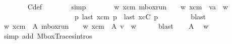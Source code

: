 \begin{isabellebody}
\ \ \ \ \ \ \isamarkupfalse%
\ C{}{\isacharunderscore}{\kern0pt}def\isanewline
\ \ \ \ \ \ \isamarkupfalse%
\ simp\isanewline
\ \ \ \ \isamarkupfalse%
\ \isamarkupfalse%
\ {\isachardoublequoteopen}{\isasymexists}w\ xcm{\isachardot}{\kern0pt}\ mbox{\isacharunderscore}{\kern0pt}run\ {\isasymC}\isactrlsub {\isasymI}\isactrlsub {\isasymmm}\ {\isacharparenleft}{\kern0pt}{\isasymB}\ {}{\isacharparenright}{\kern0pt}\ w\ xcm\ {\isasymand}\ v{\isasymcdot}{\isacharbrackleft}{\kern0pt}a{\isacharbrackright}{\kern0pt}\ {\isacharequal}{\kern0pt}\ w{\isasymdown}\isactrlsub {\isacharbang}{\kern0pt}\ {\isasymand}\isanewline
\ \ \ \ \ \ \ \ \ \ \ \ \ \ \ \ \ \ \ \ \ {\isacharparenleft}{\kern0pt}{\isasymforall}p{\isachardot}{\kern0pt}\ last\ {\isacharparenleft}{\kern0pt}{\isasymC}\isactrlsub {\isasymI}\isactrlsub {\isasymmm}{\isacharhash}{\kern0pt}xcm{\isacharparenright}{\kern0pt}\ p\ {\isacharequal}{\kern0pt}\ {\isacharparenleft}{\kern0pt}last\ {\isacharparenleft}{\kern0pt}{\isasymC}\isactrlsub {\isasymI}\isactrlsub {\isasymzero}{\isacharhash}{\kern0pt}{\isacharparenleft}{\kern0pt}xc{\isasymcdot}{\isacharbrackleft}{\kern0pt}C{\isacharbrackright}{\kern0pt}{\isacharparenright}{\kern0pt}{\isacharparenright}{\kern0pt}\ p{\isacharcomma}{\kern0pt}\ {\isasymepsilon}{\isacharparenright}{\kern0pt}{\isacharparenright}{\kern0pt}{\isachardoublequoteclose}\isanewline
\ \ \ \ \ \ \isamarkupfalse%
\ blast\isanewline
\ \ \isamarkupfalse%
\isanewline
\ \ \isamarkupfalse%
\ \isamarkupfalse%
\ w\ xcm\ \ A{}{\isacharcolon}{\kern0pt}\ {\isachardoublequoteopen}mbox{\isacharunderscore}{\kern0pt}run\ {\isasymC}\isactrlsub {\isasymI}\isactrlsub {\isasymmm}\ {\isacharparenleft}{\kern0pt}{\isasymB}\ {}{\isacharparenright}{\kern0pt}\ w\ xcm{\isachardoublequoteclose}\ \ A{}{\isacharcolon}{\kern0pt}\ {\isachardoublequoteopen}v\ {\isacharequal}{\kern0pt}\ w{\isasymdown}\isactrlsub {\isacharbang}{\kern0pt}{\isachardoublequoteclose}\isanewline
\ \ \ \ \isamarkupfalse%
\ blast\isanewline
\ \ \isamarkupfalse%
\ A{}\ \isamarkupfalse%
\ {\isachardoublequoteopen}w\ {\isasymin}\ {\isasymT}\isactrlbsub {\isasymB}\ {}\isactrlesub {\isachardoublequoteclose}\isanewline
\ \ \ \ \isamarkupfalse%
\ {\isacharparenleft}{\kern0pt}simp\ add{\isacharcolon}{\kern0pt}\ MboxTraces{\isachardot}{\kern0pt}intros{\isacharparenright}{\kern0pt}\isanewline

\end{isabellebody}
